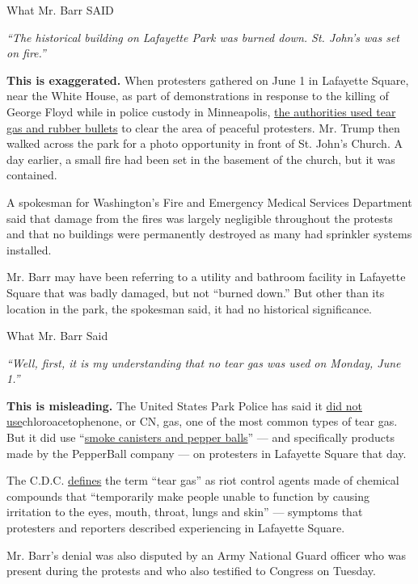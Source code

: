 What Mr. Barr SAID

\emph{``The historical building on Lafayette Park was burned down. St.
John's was set on fire.''}

\textbf{This is exaggerated.} When protesters gathered on June 1 in
Lafayette Square, near the White House, as part of demonstrations in
response to the killing of George Floyd while in police custody in
Minneapolis,
\href{https://www.nytimes3xbfgragh.onion/2020/06/02/us/politics/trump-walk-lafayette-square.html}{the
authorities used tear gas and rubber bullets} to clear the area of
peaceful protesters. Mr. Trump then walked across the park for a photo
opportunity in front of St. John's Church. A day earlier, a small fire
had been set in the basement of the church, but it was contained.

A spokesman for Washington's Fire and Emergency Medical Services
Department said that damage from the fires was largely negligible
throughout the protests and that no buildings were permanently destroyed
as many had sprinkler systems installed.

Mr. Barr may have been referring to a utility and bathroom facility in
Lafayette Square that was badly damaged, but not ``burned down.'' But
other than its location in the park, the spokesman said, it had no
historical significance.

What Mr. Barr Said

\emph{``Well, first, it is my understanding that no tear gas was used on
Monday, June 1.''}

\textbf{This is misleading.} The United States Park Police has said it
\href{https://www.factcheck.org/2020/06/the-semantics-of-tear-gas-versus-pepper-spray/}{did
not use}chloroacetophenone, or CN, gas, one of the most common types of
tear gas. But it did use
``\href{https://www.nps.gov/subjects/uspp/6_2_20_statement_from_acting_chief_monahan.htm}{smoke
canisters and pepper balls}'' --- and specifically products made by the
PepperBall company --- on protesters in Lafayette Square that day.

The C.D.C.
\href{https://emergency.cdc.gov/agent/riotcontrol/factsheet.asp}{defines}
the term ``tear gas'' as riot control agents made of chemical compounds
that ``temporarily make people unable to function by causing irritation
to the eyes, mouth, throat, lungs and skin'' --- symptoms that
protesters and reporters described experiencing in Lafayette Square.

Mr. Barr's denial was also disputed by an Army National Guard officer
who was present during the protests and who also testified to Congress
on Tuesday.

